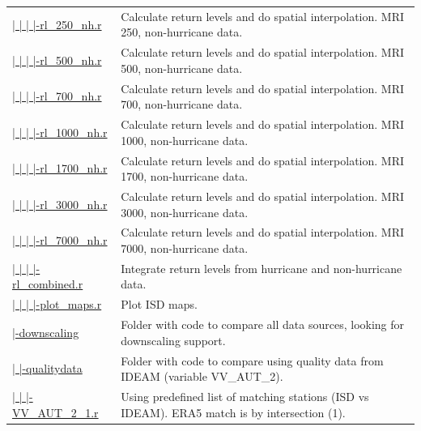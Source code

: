 \documentclass[12pt,twoside]{reedthesis}
\begin{document}
\begin{longtable}[t]{>{\raggedright\arraybackslash}p{1.3in}>{\raggedright\arraybackslash}p{4.9in}}
\href{ftp://ftp.geocorp.co/windthesis/code/pot_pp/isd/maps/return_levels_250_nh.r}{  |    |    |    |-rl\_250\_nh.r} & Calculate return levels and do spatial interpolation. MRI 250, non-hurricane data.\\
\href{ftp://ftp.geocorp.co/windthesis/code/pot_pp/isd/maps/return_levels_500_nh.r}{  |    |    |    |-rl\_500\_nh.r} & Calculate return levels and do spatial interpolation. MRI 500, non-hurricane data.\\
\href{ftp://ftp.geocorp.co/windthesis/code/pot_pp/isd/maps/return_levels_700_nh.r}{  |    |    |    |-rl\_700\_nh.r} & Calculate return levels and do spatial interpolation. MRI 700, non-hurricane data.\\
\href{ftp://ftp.geocorp.co/windthesis/code/pot_pp/isd/maps/return_levels_1000_nh.r}{  |    |    |    |-rl\_1000\_nh.r} & Calculate return levels and do spatial interpolation. MRI 1000, non-hurricane data.\\
\href{ftp://ftp.geocorp.co/windthesis/code/pot_pp/isd/maps/return_levels_1700_nh.r}{  |    |    |    |-rl\_1700\_nh.r} & Calculate return levels and do spatial interpolation. MRI 1700, non-hurricane data.\\
\href{ftp://ftp.geocorp.co/windthesis/code/pot_pp/isd/maps/return_levels_3000_nh.r}{  |    |    |    |-rl\_3000\_nh.r} & Calculate return levels and do spatial interpolation. MRI 3000, non-hurricane data.\\
\href{ftp://ftp.geocorp.co/windthesis/code/pot_pp/isd/maps/return_levels_7000_nh.r}{  |    |    |    |-rl\_7000\_nh.r} & Calculate return levels and do spatial interpolation. MRI 7000, non-hurricane data.\\
\href{ftp://ftp.geocorp.co/windthesis/code/pot_pp/isd/maps/return_levels_combined.r}{  |    |    |    |-rl\_combined.r} & Integrate return levels from hurricane and non-hurricane data.\\
\href{ftp://ftp.geocorp.co/windthesis/code/pot_pp/isd/maps/plot_maps.r}{  |    |    |    |-plot\_maps.r} & Plot ISD maps.\\
\href{ftp://ftp.geocorp.co/windthesis/code/downscaling/}{  |-downscaling} & Folder with code to compare all data sources, looking for downscaling support.\\
\href{ftp://ftp.geocorp.co/windthesis/code/downscaling/qualitydata/}{  |    |-qualitydata} & Folder with code to compare using quality data from IDEAM (variable VV\_AUT\_2).\\
\href{ftp://ftp.geocorp.co/windthesis/code/downscaling/qualitydata/comparing_VV_AUT_2_1.r}{  |    |    |-VV\_AUT\_2\_1.r} & Using predefined list of matching stations (ISD vs IDEAM). ERA5 match is by intersection (1).\\

\end{longtable}
\end{document}
